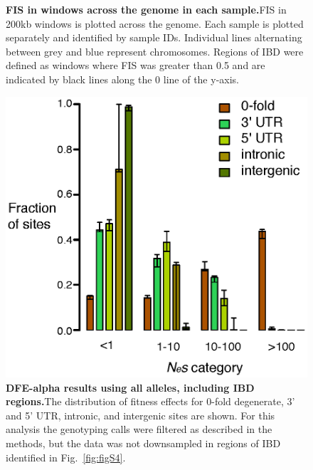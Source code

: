 \begin{figure}[h!]
    \caption{\textbf{FIS in windows across the genome in each sample.}FIS in 200kb windows is plotted across the genome. Each sample is plotted separately and identified by sample IDs. Individual lines alternating between grey and blue represent chromosomes. Regions of IBD were defined as windows where FIS was greater than 0.5 and are indicated by black lines along the 0 line of the y-axis.}
    \label{fig:figS5}
\end{figure}

\begin{figure}[h!]
      \centering
       \includegraphics[width=\linewidth]{Ch2FigS6}
    \caption{\textbf{DFE-alpha results using all alleles, including IBD regions.}The distribution of fitness effects for 0-fold degenerate, 3’ and 5’ UTR, intronic, and intergenic sites are shown. For this analysis the genotyping calls were filtered as described in the methods, but the data was not downsampled in regions of IBD identified in Fig.~\ref{fig:figS4}.}
    \label{fig:figS6}
\end{figure}

